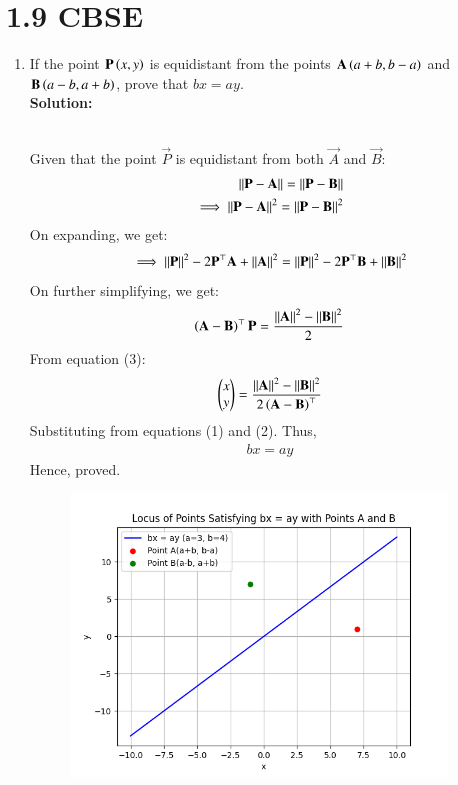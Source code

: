 \documentclass[journal]{IEEEtran}
\begin{document}
\section{1.9 CBSE}
\begin{enumerate}
\item If the point $\mathbf{P}\left(x,y\right)$ is equidistant from the points $\mathbf{A}\left(a+b,b-a\right)$ and $\mathbf{B}\left(a-b,a+b\right)$, prove that $bx=ay$.\\
\textbf{Solution:}
\begin{table}[h!]    
      \centering
      
      \caption{}
    \end{table}\\
Given that the point $\vec{P}$ is equidistant from both $\vec{A}$ and $\vec{B}$:
\begin{align}
    \left\vert\left\vert\mathbf{P}-\mathbf{A}\right\vert\right\vert = \left\vert\left\vert\mathbf{P}-\mathbf{B}\right\vert\right\vert\\
    \implies {\left\vert\left\vert\mathbf{P}-\mathbf{A}\right\vert\right\vert}^2 = {\left\vert\left\vert\mathbf{P}-\mathbf{B}\right\vert\right\vert}^2
\end{align}
On expanding, we get:
\begin{align}
    \implies \left\vert\left\vert\mathbf{P}\right\vert\right\vert^2 - 2\mathbf{P}^\top\mathbf{A} + \left\vert\left\vert\mathbf{A}\right\vert\right\vert^2 = \left\vert\left\vert\mathbf{P}\right\vert\right\vert^2 - 2\mathbf{P}^\top\mathbf{B} + \left\vert\left\vert\mathbf{B}\right\vert\right\vert^2
\end{align}
On further simplifying, we get:
\begin{align}
    \left(\mathbf{A}-\mathbf{B}\right)^\top\mathbf{P} = \frac{\left\vert\left\vert\mathbf{A}\right\vert\right\vert^2 - \left\vert\left\vert\mathbf{B}\right\vert\right\vert^2}{2}\\
\end{align}
From equation (3):
\begin{align}
    \begin{pmatrix}x\\y\end{pmatrix} = \frac{\left\vert\left\vert\mathbf{A}\right\vert\right\vert^2 - \left\vert\left\vert\mathbf{B}\right\vert\right\vert^2}{2\left(\mathbf{A}-\mathbf{B}\right)^\top}
\end{align}
Substituting from equations (1) and (2). Thus,
\begin{align}
    bx = ay
\end{align}
Hence, proved.
\begin{figure}[htp]
    \centering
    \includegraphics[width=10cm]{figs/figure.png}
    \label{fig:figure}
\end{figure}
\end{enumerate}
\end{document}
